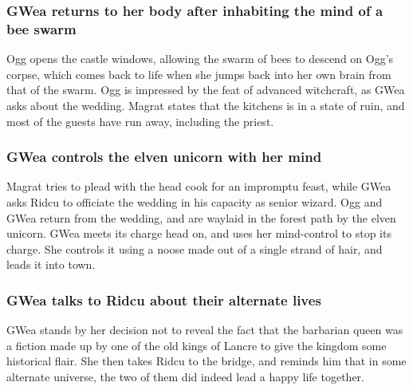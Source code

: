 \subsubsection{\Gls{GWea} returns to her body after inhabiting the mind of a bee swarm}
\Gls{Ogg} opens the castle windows, allowing the swarm of bees to descend on \Gls{Ogg}'s corpse,
which comes back to life when she jumps back into her own brain from that of the swarm. \Gls{Ogg}
is impressed by the feat of advanced witchcraft, as \Gls{GWea} asks about the wedding. \Gls{Magrat}
states that the kitchens is in a state of ruin, and most of the guests have run away, including
the priest.

\subsubsection{\Gls{GWea} controls the elven unicorn with her mind}
\Gls{Magrat} tries to plead with the head cook for an impromptu feast, while \Gls{GWea} asks
\Gls{Ridcu} to officiate the wedding in his capacity as senior wizard. \Gls{Ogg} and \Gls{GWea}
return from the wedding, and are waylaid in the forest path by the elven unicorn. \Gls{GWea} meets
its charge head on, and uses her mind-control to stop its charge. She controls it using a noose
made out of a single strand of hair, and leads it into town.

\subsubsection{\Gls{GWea} talks to \Gls{Ridcu} about their alternate lives}
\Gls{GWea} stands by her decision not to reveal the fact that the barbarian queen was a fiction made
up by one of the old kings of Lancre to give the kingdom some historical flair. She then takes
\Gls{Ridcu} to the bridge, and reminds him that in some alternate universe, the two of them did
indeed lead a happy life together.